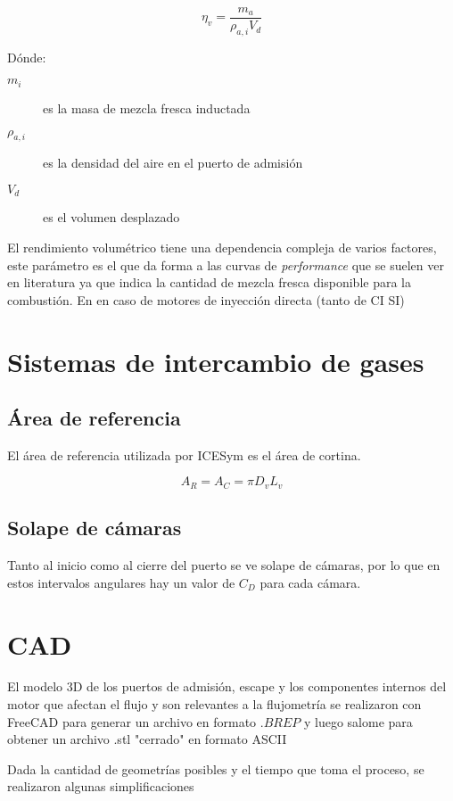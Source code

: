 \begin{equation}
    \eta_v = \frac{m_a}{\rho_{a,i}V_d}
\end{equation}

Dónde:
%
\begin{description}
    \item[$m_i$] es la masa de mezcla fresca inductada
    \item[$\rho_{a,i}$] es la densidad del aire en el puerto de admisión
    \item[$V_d$] es el volumen desplazado
\end{description}

El rendimiento volumétrico tiene una dependencia compleja de varios factores,
este parámetro es el que da forma a las curvas de \emph{performance} que se
suelen ver en literatura ya que indica la cantidad de mezcla fresca disponible
para la combustión. 
%
En en caso de motores de inyección directa (tanto de CI SI)

\section{Sistemas de intercambio de gases}
%
\subsection{Área de referencia}
%
El área de referencia utilizada por ICESym es el área de cortina.

$$ A_R = A_C = \pi D_v L_v $$

\subsection{Solape de cámaras}
%
Tanto al inicio como al cierre del puerto se ve solape de cámaras, por lo que
en estos intervalos angulares hay un valor de $C_D$ para cada cámara.

\section{CAD}
%
El modelo 3D de los puertos de admisión, escape y los componentes internos del
motor que afectan el flujo y son relevantes a la flujometría se realizaron con
FreeCAD\cite{freecad} para generar un archivo en formato $.BREP$ y luego
salome\cite{salome} para obtener un archivo .stl "cerrado" en formato ASCII

Dada la cantidad de geometrías posibles y el tiempo que toma el proceso, se
realizaron algunas simplificaciones

